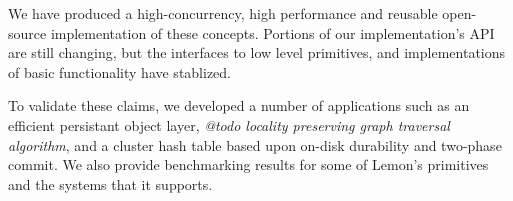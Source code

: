 \documentclass[letterpaper,twocolumn,english]{article}
\newcommand{\yad}{Lemon\xspace}
\begin{document}
We have produced a high-concurrency, high performance and reusable
open-source implementation of these concepts.  Portions of our
implementation's API are still changing, but the interfaces to low
level primitives, and implementations of basic functionality have
stablized.  

To validate these claims, we developed a number of applications such
as an efficient persistant object layer, {\em @todo locality preserving
graph traversal algorithm}, and a cluster hash table based upon
on-disk durability and two-phase commit.  We also provide benchmarking
results for some of \yad's primitives and the systems that it
supports.


\end{document}
